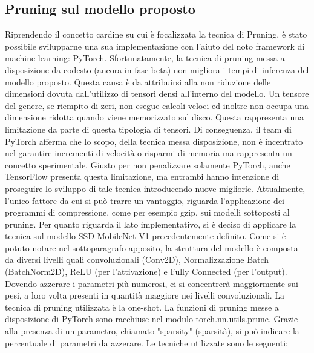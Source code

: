 \subsection{Pruning sul modello proposto}\label{pruning_model}
Riprendendo il concetto cardine su cui è focalizzata la tecnica di Pruning, è stato possibile svilupparne una sua implementazione con l'aiuto del noto framework di machine learning: PyTorch. Sfortunatamente, la tecnica di pruning messa a disposizione da codesto (ancora in fase beta) non migliora i tempi di inferenza del modello proposto. Questa causa è da attribuirsi alla non riduzione delle dimensioni dovuta dall'utilizzo di tensori densi all'interno del modello. Un tensore del genere, se riempito di zeri, non esegue calcoli veloci ed inoltre non occupa una dimensione ridotta quando viene memorizzato sul disco. Questa rappresenta una limitazione da parte di questa tipologia di tensori. Di conseguenza, il team di PyTorch afferma che lo scopo, della tecnica messa disposizione, non è incentrato nel garantire incrementi di velocità o risparmi di memoria ma rappresenta un concetto sperimentale. Giusto per non penalizzare solamente PyTorch, anche TensorFlow presenta questa limitazione, ma entrambi hanno intenzione di proseguire lo sviluppo di tale tecnica introducendo nuove migliorie. Attualmente, l'unico fattore da cui si può trarre un vantaggio, riguarda l'applicazione dei programmi di compressione, come per esempio gzip, sui modelli sottoposti al pruning. 
Per quanto riguarda il lato implementativo, si è deciso di applicare la tecnica sul modello SSD-MobileNet-V1 precedentemente definito. Come si è potuto notare nel sottoparagrafo apposito, la struttura del modello è composta da diversi livelli quali convoluzionali (Conv2D), Normalizzazione Batch (BatchNorm2D), ReLU (per l'attivazione) e Fully Connected (per l'output). Dovendo azzerare i parametri più numerosi, ci si concentrerà maggiormente sui pesi, a loro volta presenti in quantità maggiore nei livelli convoluzionali. 
La tecnica di pruning utilizzata è la one-shot.
La funzioni di pruning messe a disposizione di PyTorch sono racchiuse nel modulo torch.nn.utils.prune. Grazie alla presenza di un parametro, chiamato "sparsity" (sparsità), si può indicare la percentuale di parametri da azzerare. Le tecniche utilizzate sono le seguenti:
